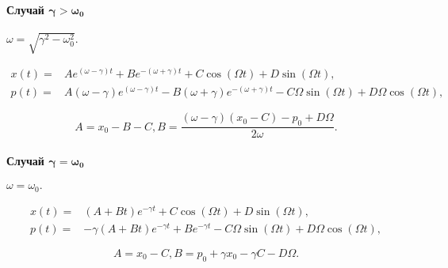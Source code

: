 \documentclass[11pt]{article}
\begin{document}
\hypertarget{ux441ux43bux443ux447ux430ux439-mathbfgamma-omega_0-1}{%
\paragraph{\texorpdfstring{Случай
\(\mathbf{\gamma > \omega_0}\)}{Случай \textbackslash mathbf\{\textbackslash gamma \textgreater{} \textbackslash omega\_0\}}}\label{ux441ux43bux443ux447ux430ux439-mathbfgamma-omega_0-1}}

\(\omega = \sqrt{\gamma^2 - \omega_0^2}.\)

\begin{align}
    x(t) = & A e^{(\omega - \gamma) t} + B e^{-(\omega + \gamma) t} + C \cos(\Omega t) + D \sin(\Omega t), \\
    p(t) = & A (\omega - \gamma) e^{(\omega - \gamma) t} - B (\omega + \gamma) e^{-(\omega + \gamma) t} -C \Omega \sin(\Omega t) + D \Omega \cos(\Omega t),
\end{align}

\[ A = x_0 - B - C, 
B = \dfrac{(\omega - \gamma)(x_0 - C) - p_0 + D \Omega}{2 \omega}. \]

\hypertarget{ux441ux43bux443ux447ux430ux439-mathbfgamma-omega_0-2}{%
\paragraph{\texorpdfstring{Случай
\(\mathbf{\gamma = \omega_0}\)}{Случай \textbackslash mathbf\{\textbackslash gamma = \textbackslash omega\_0\}}}\label{ux441ux43bux443ux447ux430ux439-mathbfgamma-omega_0-2}}

\(\omega = \omega_0.\)

\begin{align}
    x(t) = & (A + B t) e^{-\gamma t} + C \cos(\Omega t) + D \sin(\Omega t), \\
    p(t) = & -\gamma (A + B t) e^{-\gamma t} + B e^{-\gamma t} - C \Omega \sin(\Omega t) + D \Omega \cos(\Omega t),
\end{align}

\[ A = x_0 - C, 
B = p_0 + \gamma x_0 - \gamma C - D \Omega. \]
\end{document}
